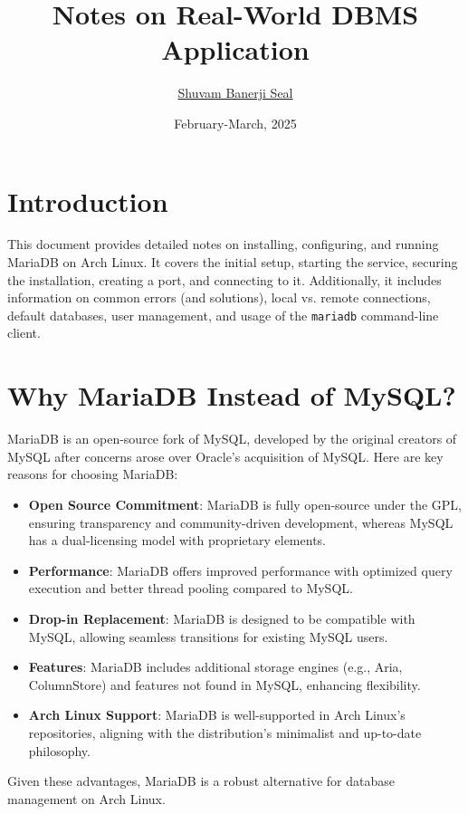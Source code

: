 \documentclass[10pt]{article}
\title{\vspace{10cm} Notes on Real-World DBMS Application}
\author{ \href{https://shuvam-banerji-seal.github.io/}{Shuvam Banerji Seal}}
\date{February-March, 2025}
\begin{document}
\maketitle
\thispagestyle{empty}
\clearpage

\tableofcontents
\thispagestyle{fancy}
\clearpage
\section{Introduction}
This document provides detailed notes on installing, configuring, and running MariaDB on Arch Linux. It covers the initial setup, starting the service, securing the installation, creating a port, and connecting to it. Additionally, it includes information on common errors (and solutions), local vs. remote connections, default databases, user management, and usage of the \texttt{mariadb} command-line client.

\section{Why MariaDB Instead of MySQL?}
MariaDB is an open-source fork of MySQL, developed by the original creators of MySQL after concerns arose over Oracle's acquisition of MySQL. Here are key reasons for choosing MariaDB:
\begin{itemize}
    \item \textbf{Open Source Commitment}: MariaDB is fully open-source under the GPL, ensuring transparency and community-driven development, whereas MySQL has a dual-licensing model with proprietary elements.
    \item \textbf{Performance}: MariaDB offers improved performance with optimized query execution and better thread pooling compared to MySQL.
    \item \textbf{Drop-in Replacement}: MariaDB is designed to be compatible with MySQL, allowing seamless transitions for existing MySQL users.
    \item \textbf{Features}: MariaDB includes additional storage engines (e.g., Aria, ColumnStore) and features not found in MySQL, enhancing flexibility.
    \item \textbf{Arch Linux Support}: MariaDB is well-supported in Arch Linux’s repositories, aligning with the distribution’s minimalist and up-to-date philosophy.
\end{itemize}
Given these advantages, MariaDB is a robust alternative for database management on Arch Linux.
\end{document}
